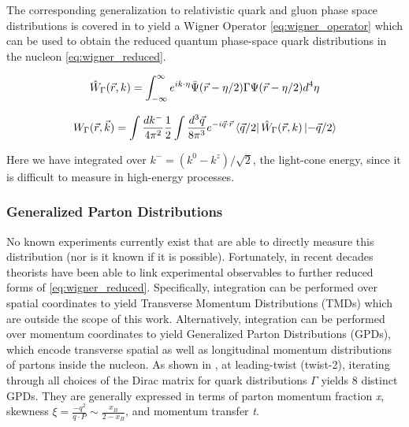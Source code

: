         

            The corresponding generalization to relativistic quark and gluon phase space distributions is covered in \parencite{Ji2004GENERALIZEDDISTRIBUTIONS} to yield a Wigner Operator \eqref{eq:wigner_operator} which can be used to obtain the reduced quantum phase-space quark distributions in the nucleon \eqref{eq:wigner_reduced}. 

            \begin{equation}\label{eq:wigner_operator}
                \hat{W}_{\Gamma}(\Vec{r},k) = \int_{-\infty}^{\infty} e^{ik\cdot\eta} \Bar{\Psi}(\Vec{r}-\eta/2) \Gamma \Psi(\Vec{r}-\eta/2)  d^4\eta
            \end{equation}

            \begin{equation}\label{eq:wigner_reduced}
                     W_{\Gamma}(\Vec{r},\Vec{k}) = \int \frac{dk^-}{4\pi^2} \frac{1}{2}   \int \frac{d^3\Vec{q}}{8\pi^3}  e^{-i\Vec{q}\cdot\Vec{r}} \bra{\Vec{q}/2} \hat{W}_{\Gamma}(\Vec{r},k)\ket{-\Vec{q}/2}
            \end{equation}

            Here we have integrated over $k^- = (k^0-k^z)/\sqrt{2}$, the light-cone energy, since it is difficult to measure in high-energy processes. 
    
    
        \subsubsection*{Generalized Parton Distributions}\label{sec:ch1sec2GPDs}

            No known experiments currently exist that are able to directly measure this distribution (nor is it known if it is possible). Fortunately, in recent decades theorists have been able to link experimental observables to further reduced forms of \eqref{eq:wigner_reduced}. Specifically, integration can be performed over spatial coordinates to yield Transverse Momentum Distributions (TMDs) which are outside the scope of this work. Alternatively, integration can be performed over momentum coordinates to yield Generalized Parton Distributions (GPDs), which encode transverse spatial as well as longitudinal momentum distributions of partons inside the nucleon. As shown in \parencite{Ji2004GENERALIZEDDISTRIBUTIONS}, at leading-twist (twist-2), iterating through all choices of the Dirac matrix for quark distributions $\Gamma$ yields 8 distinct GPDs. They are generally expressed in terms of parton momentum fraction \textit{x}, skewness $\xi = \frac{-q^2}{q \cdot P} \sim \frac{x_B}{2-x_B}$, and momentum transfer \textit{t}.
            
